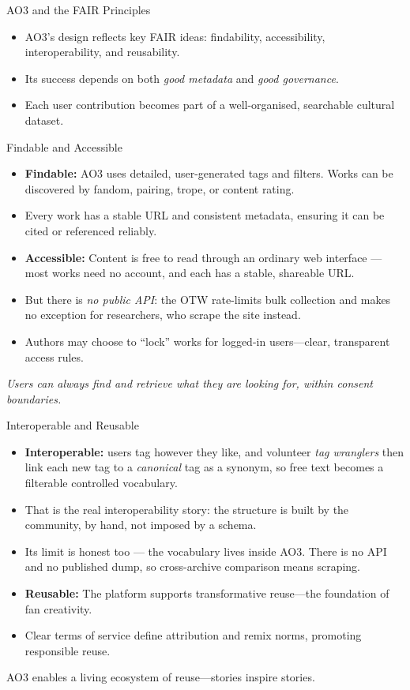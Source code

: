 \documentclass[aspectratio=169]{beamer}
\begin{document}
\begin{frame}{AO3 and the FAIR Principles}
\begin{itemize}
  \item AO3’s design reflects key FAIR ideas: findability, accessibility, interoperability, and reusability.  
  \item Its success depends on both \emph{good metadata} and \emph{good governance}.  
  \item Each user contribution becomes part of a well-organised, searchable cultural dataset.
\end{itemize}
\end{frame}

\begin{frame}{Findable and Accessible}
\begin{itemize}
  \item \textbf{Findable:} AO3 uses detailed, user-generated tags and filters. Works can be discovered by fandom, pairing, trope, or content rating.  
  \item Every work has a stable URL and consistent metadata, ensuring it can be cited or referenced reliably.  
  \item \textbf{Accessible:} Content is free to read through an ordinary web interface --- most works need no account, and each has a stable, shareable URL.
  \item But there is \emph{no public API}: the OTW rate-limits bulk collection and makes no exception for researchers, who scrape the site instead.
  \item Authors may choose to “lock” works for logged-in users—clear, transparent access rules.
\end{itemize}
\textit{Users can always find and retrieve what they are looking for, within consent boundaries.}
\end{frame}

\begin{frame}{Interoperable and Reusable}
\begin{itemize}
  \item \textbf{Interoperable:} users tag however they like, and volunteer
    \emph{tag wranglers} then link each new tag to a \emph{canonical} tag as a
    synonym, so free text becomes a filterable controlled vocabulary.
  \item That is the real interoperability story: the structure is built by the
    community, by hand, not imposed by a schema.
  \item Its limit is honest too --- the vocabulary lives inside AO3.  There is
    no API and no published dump, so cross-archive comparison means scraping.
  \item \textbf{Reusable:} The platform supports transformative reuse—the foundation of fan creativity.
  \item Clear terms of service define attribution and remix norms, promoting responsible reuse.
\end{itemize}
AO3 enables a living ecosystem of reuse—stories inspire stories.
\end{frame}
\end{document}
